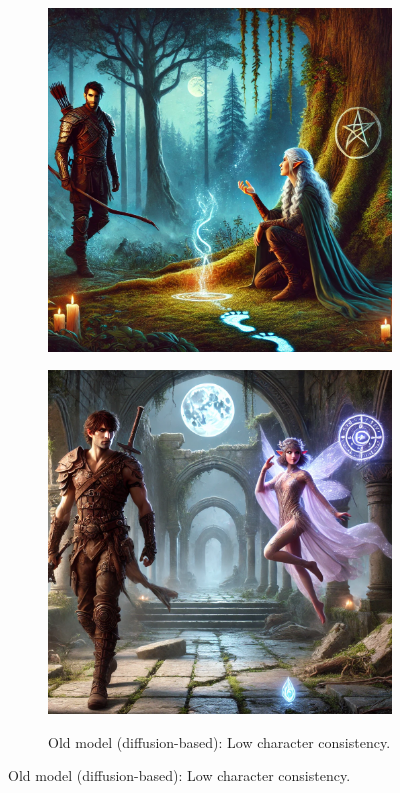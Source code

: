 \begin{figure}[t]
\begin{subfigure}[t]{\textwidth}
\begin{minipage}[t]{0.3\textwidth}
            \includegraphics[width=\linewidth]{resources/characters_old_s1}
            \label{fig:char-old-s1}
        \end{minipage}
        \hspace{0.01\textwidth}
        \begin{minipage}[t]{0.3\textwidth}
            \centering
            \includegraphics[width=\linewidth]{resources/characters_old_s2}
            \label{fig:char-old-s2}
        \end{minipage}
        \caption{Old model (diffusion-based): Low character consistency.}
        \label{fig:char-old-row}
    \end{subfigure}


\end{figure}
